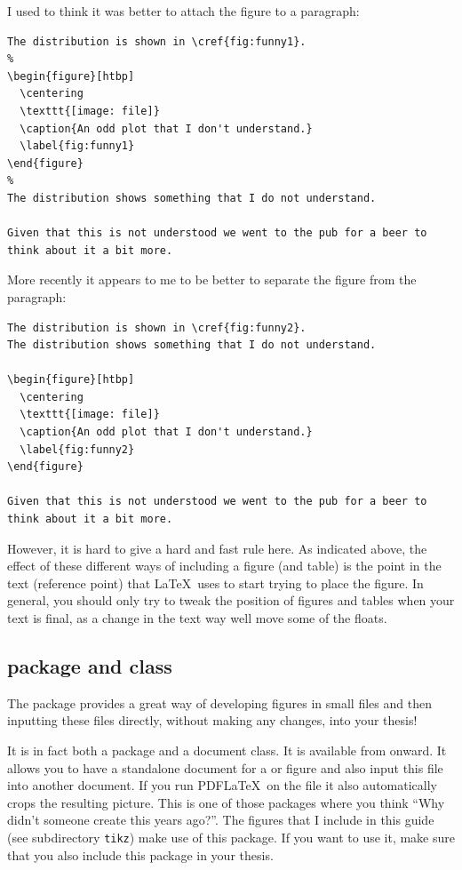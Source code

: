 I used to think it was better to attach the figure to a paragraph:
\begin{verbatim}
The distribution is shown in \cref{fig:funny1}.
%
\begin{figure}[htbp]
  \centering
  \texttt{[image: file]}
  \caption{An odd plot that I don't understand.}
  \label{fig:funny1}
\end{figure}
%
The distribution shows something that I do not understand.

Given that this is not understood we went to the pub for a beer to
think about it a bit more.
\end{verbatim}

More recently it appears to me to be better to separate the figure
from the paragraph:
\begin{verbatim}
The distribution is shown in \cref{fig:funny2}.
The distribution shows something that I do not understand.

\begin{figure}[htbp]
  \centering
  \texttt{[image: file]}
  \caption{An odd plot that I don't understand.}
  \label{fig:funny2}
\end{figure}

Given that this is not understood we went to the pub for a beer to
think about it a bit more.
\end{verbatim}

However, it is hard to give a hard and fast rule here.
As indicated above, the effect of these different ways of including a figure (and table) is the point in the text (reference point) that \LaTeX\ uses to start trying to place the figure.
In general, you should only try to tweak the position of figures and tables when your text is final,
as a change in the text way well move some of the floats.

\subsection{ package and class}%
\label{sec:fig:standalone}

The  package provides a great way of developing
figures in small files and then inputting these files directly,
without making any changes, into your thesis!

It is in fact both a package and a document class. It is
available from  onward. It allows you to have a
standalone document for a  or  figure
and also input this file into another document. If you run PDF\LaTeX\
on the file it also automatically crops the resulting picture. This is
one of those packages where you think \enquote{Why didn't someone
  create this years ago?}. The \TikZ figures that I include in this
guide (see subdirectory \texttt{tikz}) make use of this package. If
you want to use it, make sure that you also include this package in
your thesis.


